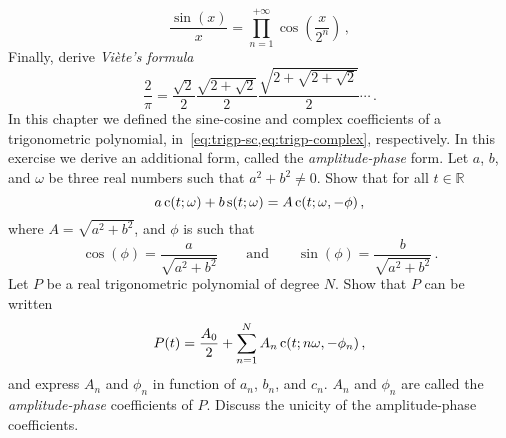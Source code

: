 \begin{ExerciseList}
  \begin{equation}
    \frac{\sin(x)}{x}=\prod_{n=1}^{+\infty}\cos\left(\frac{x}{2^n}\right)\,,
  \end{equation}
  \Question Finally, derive \emph{Viète's formula}
  \begin{equation}
    \frac{2}{\pi}=\frac{\sqrt{2}}{2}
    \frac{\sqrt{2+\sqrt{2}}}{2}\frac{\sqrt{2+\sqrt{2+\sqrt{2}}}}{2}\cdots\,.
  \end{equation}
  \Exercise[label=ampphase] In this chapter we defined the sine-cosine and complex
  coefficients of a trigonometric polynomial, in~\cref{eq:trigp-sc,eq:trigp-complex},
  respectively. In this exercise we derive an additional form, called the
  \emph{amplitude-phase} form. \Question Let $a$, $b$, and $\omega$ be three real numbers
  such that $a^2+b^2\neq0$. Show that for all $t\in\mathbb{R}$
  \begin{equation}
    a\operatorname{c}(t;\omega)+b\operatorname{s}(t;\omega)=A\operatorname{c}(t;\omega,-\phi)\,,
  \end{equation}
  where $A=\sqrt{a^2+b^2}$, and $\phi$ is such that
  \begin{equation}
    \cos(\phi)=\frac{a}{\sqrt{a^2+b^2}}\qquad\text{and}\qquad
    \sin(\phi)=\frac{b}{\sqrt{a^2+b^2}}\,.
  \end{equation}
  \Question Let $P$ be a real trigonometric polynomial of degree $N$. Show that $P$ can be
  written
  \begin{equation}
    P(t)=\frac{A_0}{2}+\sum_{n=1}^NA_n\operatorname{c}(t;n\omega,-\phi_n)\,,
  \end{equation}
  and express $A_n$ and $\phi_n$ in function of $a_n$, $b_n$, and $c_n$. $A_n$ and
  $\phi_n$ are called the \emph{amplitude-phase} coefficients of $P$. \Question Discuss
  the unicity of the amplitude-phase coefficients.
\end{ExerciseList}
